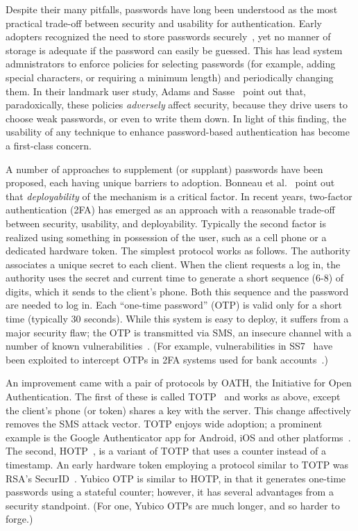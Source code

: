 %
%
\label{sec:related}

Despite their many pitfalls, passwords have long been understood as the most
practical trade-off between security and usability for authentication.
%
Early adopters recognized the need to store passwords
securely~\cite{morris1979password}, yet no manner of storage is adequate if the
password can easily be guessed. This has lead system admnistrators to enforce
policies for selecting passwords (for example, adding special characters, or
requiring a minimum length) and periodically changing them.  In their landmark
user study, Adams and Sasse~\cite{adams1999users} point out that, paradoxically,
these policies \emph{adversely} affect security, because they drive users to
choose weak passwords, or even to write them down.  In light of this finding,
the usability of any technique to enhance password-based authentication has
become a first-class concern.

A number of approaches to supplement (or supplant) passwords have been proposed,
each having unique barriers to adoption. Bonneau et al.~\cite{bonneau2012quest}
point out that \emph{deployability} of the mechanism is a critical factor.
%
In recent years, two-factor authentication (2FA) has emerged as an approach with
a reasonable trade-off between security, usability, and deployability.
Typically the second factor is realized using something in possession of the
user, such as a cell phone or a dedicated hardware token.
%
The simplest protocol works as follows. The authority associates a unique secret to
each client. When the client requests a log in, the authority uses the secret and
current time to generate a short sequence (6-8) of digits, which it sends to the
client's phone. Both this sequence and the password are needed to log in. Each
``one-time password'' (OTP) is valid only for a short time (typically 30
seconds). While this system is easy to deploy, it suffers from a major security
flaw; the OTP is transmitted via SMS, an insecure channel with a number of known
vulnerabilities~\cite{reaves2016sending}. (For example, vulnerabilities in
SS7~\cite{engel2008locating} have been exploited to intercept OTPs in 2FA
systems used for bank accounts~\cite{schwachstelle}.)

An improvement came with a pair of protocols by OATH, the Initiative for Open
Authentication. The first of these is called TOTP~\cite{rfc6238} and works as
above, except the client's phone (or token) shares a key with the server. This
change affectively removes the SMS attack vector.
%
TOTP enjoys wide adoption; a prominent example is the Google Authenticator app
for Android, iOS and other platforms~\cite{googleauth}. The second,
HOTP~\cite{rfc4226}, is a variant of TOTP that uses a counter instead of a
timestamp.
%
An early hardware token employing a protocol similar to TOTP was RSA's
SecurID~\cite{securid}.
%
Yubico OTP is similar to HOTP, in that it generates one-time passwords using a
stateful counter; however, it has several advantages from a security standpoint.
(For one, Yubico OTPs are much longer, and so harder to forge.)

